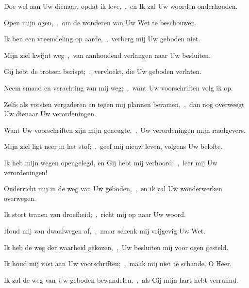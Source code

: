 \documentclass[12pt,twoside,a5paper]{article}
\begin{document}
\begin{halfparskip}
   Doe wel aan Uw dienaar, opdat ik leve,~\sep\ en Ik zal Uw woorden onderhouden.


  Open mijn ogen,~\sep\ om de wonderen van Uw Wet te beschouwen.

  Ik ben een vreemdeling op aarde,~\sep\ verberg mij Uw geboden niet.

  Mijn ziel kwijnt weg~\sep\ van aanhoudend verlangen naar Uw besluiten.

  Gij hebt de trotsen berispt;~\sep\ vervloekt, die Uw geboden verlaten.

  Neem smaad en verachting van mij weg;~\sep\ want Uw voorschriften volg ik op.

  Zelfs als vorsten vergaderen en tegen mij plannen beramen,~\sep\ dan nog overweegt Uw dienaar Uw verordeningen.

  Want Uw voorschriften zijn mijn geneugte,~\sep\ Uw verordeningen mijn raadgevers.
\end{halfparskip}

\begin{halfparskip}
   Mijn ziel ligt neer in het stof;~\sep\ geef mij nieuw leven, volgens Uw belofte.


  Ik heb mijn wegen opengelegd, en Gij hebt mij verhoord;~\sep\ leer mij Uw verordeningen!

  Onderricht mij in de weg van Uw geboden,~\sep\ en ik zal Uw wonderwerken overwegen.

  Ik stort tranen van droefheid;~\sep\ richt mij op naar Uw woord.

  Houd mij van dwaalwegen af,~\sep\ maar schenk mij vrijgevig Uw Wet.

  Ik heb de weg der waarheid gekozen,~\sep\ Uw besluiten mij voor ogen gesteld.

  Ik houd mij vast aan Uw voorschriften;~\sep\ maak mij niet te schande, O Heer.

  Ik zal de weg van Uw geboden bewandelen,~\sep\ als Gij mijn hart hebt verruimd.
\end{halfparskip}
\end{document}
